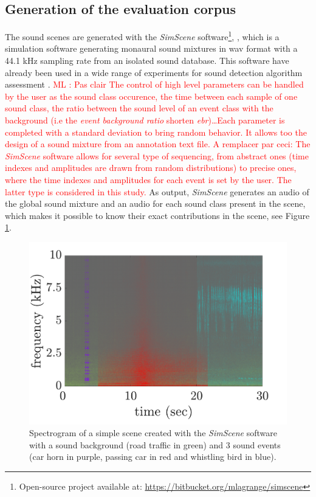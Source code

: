 \documentclass[review,5p,twocolumn,sort&compress,times]{elsarticle}
\newcommand{\ml}[1]{\textcolor{red}{ML : #1}}
\begin{document}
\subsection{Generation of the evaluation corpus}\label{part:simScene}
The sound scenes are generated with the \textit{SimScene} software\footnote{Open-source project available at: \url{https://bitbucket.org/mlagrange/simscene}}, \cite{rossignol_simscene:_2015}, which is a simulation software generating monaural sound mixtures in wav format with a 44.1 kHz sampling rate from an isolated sound database.
This software have already been used in a wide range of experiments for sound detection algorithm assessment \cite{lafay_new_2014, benetos2016detection}. \ml{Pas clair The control of high level parameters can be handled by the user as the sound class occurence, the time between each sample of one sound class, the ratio between the sound level of an event class with the background (i.e the \textit{event background ratio} shorten \textit{ebr})\dots Each parameter is completed with a standard deviation to bring random behavior. It allows too the design of a sound mixture from an annotation text file. A remplacer par ceci: The \textit{SimScene} software allows for several type of sequencing, from abstract ones (time indexes and amplitudes are drawn from random distributions) to  precise ones, where the time indexes and amplitudes for each event is set by the user. The latter type is considered in this study.}
As output, \textit{SimScene} generates an audio of the global sound mixture and an audio for each sound class present in the scene, which makes it possible to know their exact contributions in the scene, see Figure \ref{fig:example_simScene}.

\begin{figure}[t]
    \centering
       \includegraphics[width=.8\linewidth]{./figures/exampleSimScene.pdf}
    \caption{Spectrogram of a simple scene created with the \textit{SimScene} software with a sound background (road traffic in green) and 3 sound events (car horn in purple, passing car in red and whistling bird in blue).}
    \label{fig:example_simScene}
\end{figure}
\end{document}
